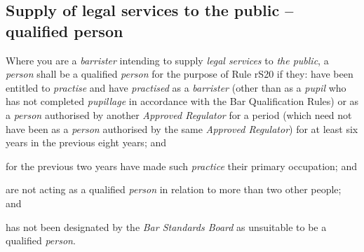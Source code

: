 \subsection{Supply of legal services to the public -- qualified person}
\nl\item Where you are a \emph{barrister} intending to supply \emph{legal
services} to \emph{the public}, a \emph{person} shall be a qualified
\emph{person} for the purpose of Rule rS20 if they:
\all have been entitled to \emph{practise} and have \emph{practised} as a
\emph{barrister} (other than as a \emph{pupil} who has not completed
\emph{pupillage} in accordance with the Bar Qualification Rules) or as a
\emph{person} authorised by another \emph{Approved Regulator} for a
period (which need not have been as a \emph{person} authorised by the
same \emph{Approved Regulator}) for at least six years in the previous
eight years; and

\item for the previous two years have made such \emph{practice} their
primary occupation; and

\item are not acting as a qualified \emph{person} in relation to more than
two other people; and

\item has not been designated by the \emph{Bar Standards Board} as
unsuitable to be a qualified \emph{person}.\la

